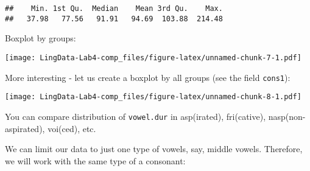 \documentclass[]{article}
\newenvironment{Shaded}{\begin{snugshade}}{\end{snugshade}}
\newcommand{\KeywordTok}[1]{\textcolor[rgb]{0.13,0.29,0.53}{\textbf{#1}}}
\newcommand{\StringTok}[1]{\textcolor[rgb]{0.31,0.60,0.02}{#1}}
\newcommand{\OperatorTok}[1]{\textcolor[rgb]{0.81,0.36,0.00}{\textbf{#1}}}
\newcommand{\NormalTok}[1]{#1}
\begin{document}
\begin{verbatim}
##    Min. 1st Qu.  Median    Mean 3rd Qu.    Max. 
##   37.98   77.56   91.91   94.69  103.88  214.48
\end{verbatim}

Boxplot by groups:

\begin{Shaded}
\end{Shaded}

\texttt{[image: LingData-Lab4-comp\_files/figure-latex/unnamed-chunk-7-1.pdf]}

More interesting - let us create a boxplot by all groups (see the field
\texttt{cons1}):

\begin{Shaded}
\end{Shaded}

\texttt{[image: LingData-Lab4-comp\_files/figure-latex/unnamed-chunk-8-1.pdf]}

You can compare distribution of \texttt{vowel.dur} in asp(irated),
fri(cative), nasp(non-aspirated), voi(ced), etc.

We can limit our data to just one type of vowels, say, middle vowels.
Therefore, we will work with the same type of a consonant:

\begin{Shaded}
\end{Shaded}
\end{document}
